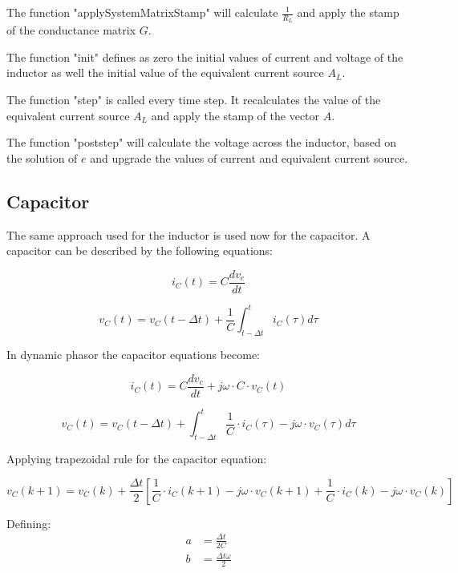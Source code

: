 The function "applySystemMatrixStamp" will calculate $\frac{1}{R_L}$ and apply the stamp of the conductance matrix $G$.

The function "init" defines as zero the initial values of current and voltage of the inductor as well the initial value of the equivalent current source $A_L$.

The function "step" is called every time step. It recalculates the value of the equivalent current source $A_L$ and apply the stamp of the vector $A$.

The function "poststep" will calculate the voltage across the inductor, based on the solution of $e$ and upgrade the values of current and equivalent current source.
 

\subsection{Capacitor}

The same approach used for the inductor is used now for the capacitor.
A capacitor can be described by the following equations:

\begin{equation}
	i_C(t)= C \frac{d v_c}{dt}
\end{equation}

\begin{equation}
	v_C(t)= v_C(t - \Delta t) + \frac{1}{C} \int_{t - \Delta t}^{t} i_C (\tau) d \tau
\end{equation}

In dynamic phasor the capacitor equations become:

\begin{equation}
        i_C(t)= C \frac{d v_c}{dt} + j \omega \cdot C \cdot v_C(t)
\end{equation}

\begin{equation}
        v_C(t) = v_C(t- \Delta t) +  \int_{t- \Delta t}^{t} \frac{1}{C} \cdot i_C(\tau) -j \omega \cdot v_C(\tau)d \tau 
\end{equation}

Applying trapezoidal rule for the capacitor equation:

\begin{equation}
        v_C(k+1) = v_C(k) + \frac{\Delta t}{2} \left[ \frac{1}{C} \cdot i_C(k+1) - j \omega \cdot v_C(k+1) + \frac{1}{C} \cdot i_C(k) - j \omega \cdot v_C(k) \right]
\end{equation}

Defining:
\begin{align}
        a &= \frac{\Delta t}{2C} \\
        b &= \frac{\Delta t \omega}{2}
\end{align}

